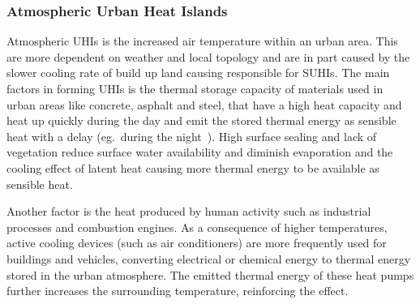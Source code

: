 \documentclass[12pt,a4paper, english,twoside]{scrartcl}
\begin{document}
    \subsubsection{Atmospheric Urban Heat Islands}\label{sec:at_uhi}
      Atmospheric \glspl{UHI} is the increased air temperature within an urban area. 
      This are more dependent on weather and local topology and are in part caused by the slower cooling rate of build up land causing responsible for \glspl{SUHI}.
      The main factors in forming \glspl{UHI} is the thermal storage capacity of materials used in urban areas like concrete, asphalt and steel, that have a high heat capacity and heat up quickly during the day and emit the stored thermal energy as sensible heat with a delay (eg.~during the night~\autocite{Ramamurthy2014}).
      High surface sealing and lack of vegetation reduce surface water availability and diminish evaporation and the cooling effect of latent heat causing more thermal energy to be available as sensible heat. 
    
      Another factor is the heat produced by human activity such as industrial processes and combustion engines.
      As a consequence of higher temperatures, active cooling devices (such as air conditioners) are more frequently used for buildings and vehicles, converting electrical or chemical energy to thermal energy stored in the urban atmosphere. 
      The emitted thermal energy of these heat pumps further increases the surrounding temperature, reinforcing the effect.
      \\
      
\end{document}
